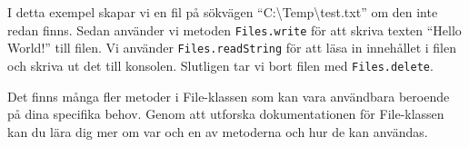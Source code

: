 \begin{Shaded}
\begin{Highlighting}[]
         \OperatorTok{\{}
\OperatorTok{(}\OperatorTok{(}\OperatorTok{),} \OperatorTok{());}
        \OperatorTok{\}}  \OperatorTok{(}\OperatorTok{)} \OperatorTok{\{}
\OperatorTok{();}
        \OperatorTok{\}}

         \OperatorTok{\{}
            \OperatorTok{=}\OperatorTok{(}\OperatorTok{(}\OperatorTok{));}
            \OperatorTok{(}\OperatorTok{);}
        \OperatorTok{\}}  \OperatorTok{(}\OperatorTok{)} \OperatorTok{\{}
\OperatorTok{();}
        \OperatorTok{\}}

         \OperatorTok{\{}
\OperatorTok{(}\OperatorTok{(}\OperatorTok{));}
        \OperatorTok{\}}  \OperatorTok{(}\OperatorTok{)} \OperatorTok{\{}
\OperatorTok{();}
        \OperatorTok{\}}
    \OperatorTok{\}}
\OperatorTok{\}}
\end{Highlighting}
\end{Shaded}

I detta exempel skapar vi en fil på sökvägen
``C:\textbackslash Temp\textbackslash test.txt'' om den inte redan
finns. Sedan använder vi metoden \texttt{Files.write} för att skriva
texten ``Hello World!'' till filen. Vi använder
\texttt{Files.readString} för att läsa in innehållet i filen och skriva
ut det till konsolen. Slutligen tar vi bort filen med
\texttt{Files.delete}.

Det finns många fler metoder i File-klassen som kan vara användbara
beroende på dina specifika behov. Genom att utforska dokumentationen för
File-klassen kan du lära dig mer om var och en av metoderna och hur de
kan användas.


